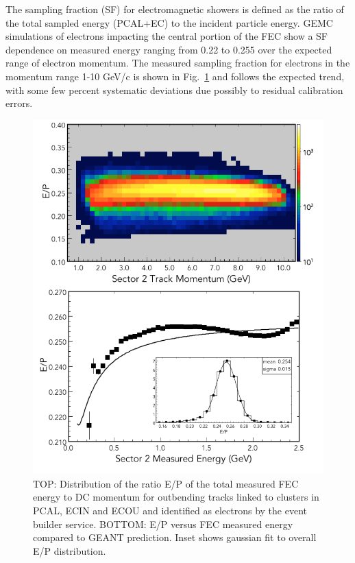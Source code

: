 The sampling fraction (SF) for electromagnetic showers is defined as the ratio of the total sampled energy (PCAL+EC) to the incident particle energy.  GEMC simulations of electrons impacting the central portion of the FEC show a SF dependence on measured energy ranging from 0.22 to 0.255 over the expected range of electron momentum.  The measured sampling fraction for electrons in the momentum range 1-10 GeV/c is shown in Fig.~\ref{fig:S10_1_0} and follows the expected trend, with some few percent systematic deviations due possibly to residual calibration errors.

\begin{figure}[t]
\centering
\includegraphics[width=1.0\columnwidth,keepaspectratio]{img/S10_1_0.png}
\caption[]{TOP: Distribution of the ratio E/P of the total measured FEC energy to DC momentum for outbending tracks linked to clusters in PCAL, ECIN and ECOU and identified as electrons by the event builder service.  BOTTOM: E/P versus FEC measured energy compared to GEANT prediction.  Inset shows gaussian fit to overall E/P distribution.}
\label{fig:S10_1_0}
\end{figure}

